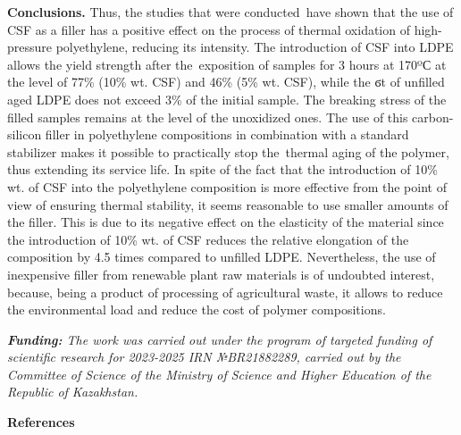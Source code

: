\begin{multicols}{2}
{\bfseries Conclusions.} Thus, the studies that were conducted~have shown
that the use of CSF as a filler has a positive effect on the process of
thermal oxidation of high-pressure polyethylene, reducing its intensity.
The introduction of CSF into LDPE allows the yield strength after
the~exposition of samples for 3 hours at 170ºС at the level of 77\%
(10\% wt. CSF) and 46\% (5\% wt. CSF), while the ϭt of unfilled aged
LDPE does not exceed 3\% of the initial sample. The breaking stress of
the filled samples remains at the level of the unoxidized ones. The use
of this carbon-silicon filler in polyethylene compositions in
combination with a standard stabilizer makes it possible to practically
stop the~thermal aging of the polymer, thus extending its service life.
In spite of the fact that the introduction of 10\% wt. of CSF into the
polyethylene composition is more effective from the point of view of
ensuring thermal stability, it seems reasonable to use smaller amounts
of the filler. This is due to its negative effect on the elasticity of
the material since the introduction of 10\% wt. of CSF reduces the
relative elongation of the composition by 4.5 times compared to unfilled
LDPE. Nevertheless, the use of inexpensive filler from renewable plant
raw materials is of undoubted interest, because, being a product of
processing of agricultural waste, it allows to reduce the environmental
load and reduce the cost of polymer compositions.

\emph{{\bfseries Funding:} The work was carried out under the program of
targeted funding of scientific research for 2023-2025 IRN №BR21882289,
carried out by the Committee of Science of the Ministry of Science and
Higher Education of the Republic of Kazakhstan.}
\end{multicols}

\begin{center}
{\bfseries References}
\end{center}

